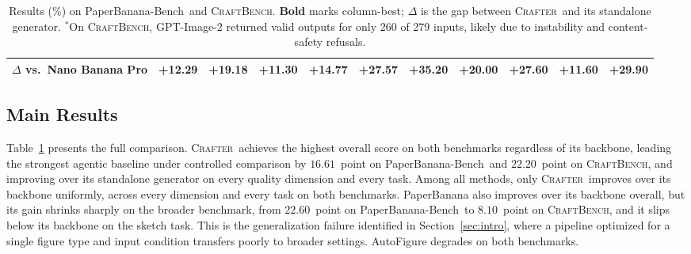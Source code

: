 \documentclass{llmxive}
\providecommand{\Crafter}{\textsc{Crafter}\xspace}
\providecommand{\CrafterBench}{\textsc{CraftBench}\xspace}
\providecommand{\PaperBananaBench}{PaperBanana-Bench\xspace}
\begin{document}
\begin{table}[t]
{\begin{tabular}{lrrrrrrrrrr}
\rowcolor{gray!8} \quad $\Delta$ vs.\ Nano Banana Pro & +12.29 & +19.18 & +11.30 & +14.77 & +27.57 & +35.20 & +20.00 & +27.60 & +11.60 & +29.90 \\
\bottomrule
\end{tabular}
}
\caption{Results (\%) on \PaperBananaBench\ and \CrafterBench. \textbf{Bold} marks column-best; $\Delta$ is the gap between \Crafter\ and its standalone generator. $^{*}$On \CrafterBench, GPT-Image-2 returned valid outputs for only 260 of 279 inputs, likely due to instability and content-safety refusals.}
\label{tab:main-results}
\end{table}

\subsection{Main Results}
\label{sec:exp-headline}

Table~\ref{tab:main-results} presents the full comparison. \Crafter\ achieves the highest overall score on both benchmarks regardless of its backbone, leading the strongest agentic baseline under controlled comparison by $16.61$~point on \PaperBananaBench\ and $22.20$~point on \CrafterBench, and improving over its standalone generator on every quality dimension and every task. Among all methods, only \Crafter\ improves over its backbone uniformly, across every dimension and every task on both benchmarks. PaperBanana also improves over its backbone overall, but its gain shrinks sharply on the broader benchmark, from $22.60$~point on \PaperBananaBench\ to $8.10$~point on \CrafterBench, and it slips below its backbone on the sketch task. This is the generalization failure identified in Section~\ref{sec:intro}, where a pipeline optimized for a single figure type and input condition transfers poorly to broader settings. AutoFigure degrades on both benchmarks.
\end{document}
